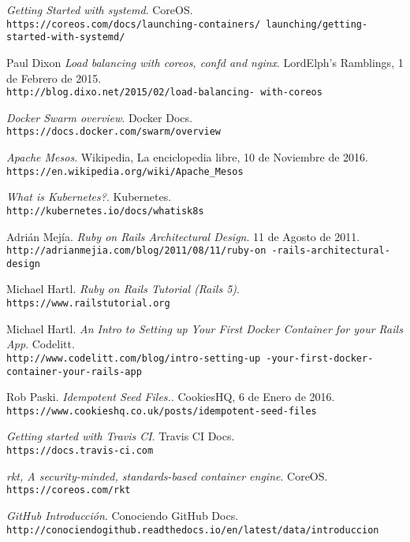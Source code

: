 \begin{thebibliography}{9}
\textit{Getting Started with systemd}. 
CoreOS.
\\\texttt{https://coreos.com/docs/launching-containers/
launching/getting-started-with-systemd/}

Paul Dixon
\textit{Load balancing with coreos, confd and nginx}. 
LordElph's Ramblings, 1 de Febrero de 2015.
\\\texttt{http://blog.dixo.net/2015/02/load-balancing-
with-coreos}

\textit{Docker Swarm overview}. 
Docker Docs.
\\\texttt{https://docs.docker.com/swarm/overview}

\textit{Apache Mesos}. 
Wikipedia, La enciclopedia libre, 10 de Noviembre de 2016.
\\\texttt{https://en.wikipedia.org/wiki/Apache\_Mesos}

\textit{What is Kubernetes?}. 
Kubernetes.
\\\texttt{http://kubernetes.io/docs/whatisk8s}

Adrián Mejía.
\textit{Ruby on Rails Architectural Design}. 
11 de Agosto de 2011.
\\\texttt{http://adrianmejia.com/blog/2011/08/11/ruby-on
-rails-architectural-design}

Michael Hartl.
\textit{Ruby on Rails Tutorial (Rails 5)}. 
\\\texttt{https://www.railstutorial.org}

Michael Hartl.
\textit{An Intro to Setting up Your First Docker Container for your Rails App}. 
Codelitt.
\\\texttt{http://www.codelitt.com/blog/intro-setting-up
-your-first-docker-container-your-rails-app}

Rob Paski.
\textit{Idempotent Seed Files.}. 
CookiesHQ, 6 de Enero de 2016.
\\\texttt{https://www.cookieshq.co.uk/posts/idempotent-seed-files}

\textit{Getting started with Travis CI}. 
Travis CI Docs.
\\\texttt{https://docs.travis-ci.com}

\textit{rkt, A security-minded, standards-based container engine}. 
CoreOS.
\\\texttt{https://coreos.com/rkt}

\textit{GitHub Introducción}. 
Conociendo GitHub Docs.
\\\texttt{http://conociendogithub.readthedocs.io/en/latest/data/introduccion}

\end{thebibliography}


